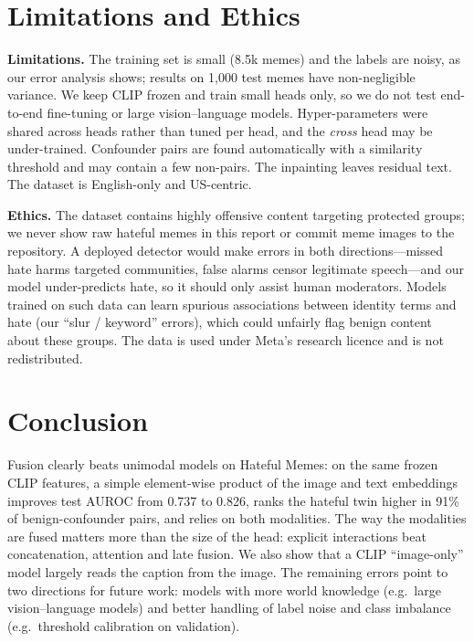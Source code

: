 \documentclass[conference]{IEEEtran}
\begin{document}
\section{Limitations and Ethics}
\textbf{Limitations.} The training set is small (8.5k memes) and the labels are noisy, as our error analysis shows;
results on 1{,}000 test memes have non-negligible variance. We keep CLIP frozen and train small heads only, so we do
not test end-to-end fine-tuning or large vision--language models. Hyper-parameters were shared across heads rather
than tuned per head, and the \emph{cross} head may be under-trained. Confounder pairs are found automatically with a
similarity threshold and may contain a few non-pairs. The inpainting leaves residual text. The dataset is English-only
and US-centric.

\textbf{Ethics.} The dataset contains highly offensive content targeting protected groups; we never show raw hateful
memes in this report or commit meme images to the repository. A deployed detector would make errors in both
directions---missed hate harms targeted communities, false alarms censor legitimate speech---and our model
under-predicts hate, so it should only assist human moderators. Models trained on such data can learn spurious
associations between identity terms and hate (our ``slur / keyword'' errors), which could unfairly flag benign
content about these groups. The data is used under Meta's research licence and is not redistributed.

\section{Conclusion}
Fusion clearly beats unimodal models on Hateful Memes: on the same frozen CLIP features, a simple element-wise
product of the image and text embeddings improves test AUROC from 0.737 to 0.826, ranks the hateful twin higher in
91\% of benign-confounder pairs, and relies on both modalities. The way the modalities are fused matters more than the
size of the head: explicit interactions beat concatenation, attention and late fusion. We also show that a CLIP
``image-only'' model largely reads the caption from the image. The remaining errors point to two directions for
future work: models with more world knowledge (e.g.\ large vision--language models) and better handling of label
noise and class imbalance (e.g.\ threshold calibration on validation).
\end{document}

